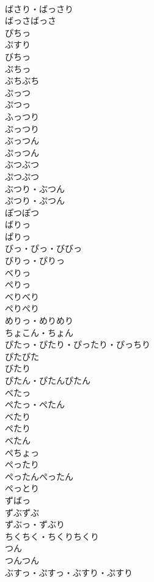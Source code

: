 \documentclass[8pt]{extreport}
\begin{document}
\begin{CJK}{UTF8}{min}
\\	ばさり・ばっさり	
\\	ばっさばっさ	
\\	ぴちっ	
\\	ぷすり	
\\	びちっ	
\\	ぷちっ	
\\	ぶちぶち	
\\	ぷっつ	
\\	ぷつっ	
\\	ふっつり	
\\	ぷっつり	
\\	ぶっつん	
\\	ぷっつん	
\\	ぶつぶつ	
\\	ぷつぷつ	
\\	ぶつり・ぶつん	
\\	ぷつり・ぷつん	
\\	ぽつぽつ	
\\	ばりっ	
\\	ぱりっ	
\\	びっ・ぴっ・びびっ	
\\	びりっ・ぴりっ	
\\	べりっ	
\\	ぺりっ	
\\	べりべり	
\\	ぺりぺり	
\\	めりっ・めりめり	
\\	ちょこん・ちょん	
\\	ぴたっ・ぴたり・ぴったり・ぴっちり	
\\	ぴたぴた	
\\	びたり	
\\	ぴたん・ぴたんぴたん	
\\	べたっ	
\\	ぺたっ・ぺたん	
\\	べたり	
\\	ぺたり	
\\	べたん	
\\	ぺちょっ	
\\	ぺったり	
\\	ぺったんぺったん	
\\	ぺっとり	
\\	ずばっ	
\\	ずぶずぶ	
\\	ずぶっ・ずぶり	
\\	ちくちく・ちくりちくり	
\\	つん	
\\	つんつん	
\\	ぶすっ・ぷすっ・ぶすり・ぷすり	

\end{CJK}
\end{document}
